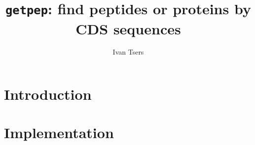 \documentclass[a4paper]{article}
\begin{document}
\pagestyle{noweb}

\title{\texttt{getpep}: find peptides or proteins by CDS sequences}
\author{Ivan Tsers}
\date{}
\maketitle

\tableofcontents

\section{Introduction}

\section{Implementation}



\end{document}
